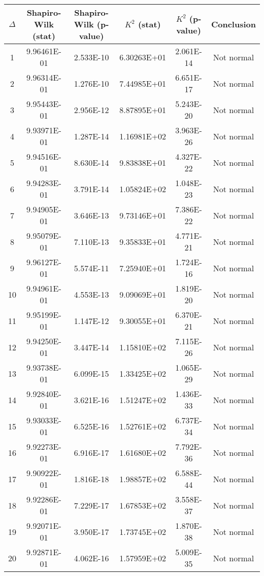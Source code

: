 \begin{table}[h]
	\begin{tabular}{|c|c|c|c|c|c|}
		\hline
		$\Delta$ &  Shapiro-Wilk (stat) & Shapiro-Wilk (p-value) & $K^2$ (stat) & $K^2$ (p-value) & Conclusion\\\hline
		\hline
		1 & 9.96461E-01 & 2.533E-10 & 6.30263E+01 & 2.061E-14 & Not normal\\\hline
		2 & 9.96314E-01 & 1.276E-10 & 7.44985E+01 & 6.651E-17 & Not normal\\\hline
		3 & 9.95443E-01 & 2.956E-12 & 8.87895E+01 & 5.243E-20 & Not normal\\\hline
		4 & 9.93971E-01 & 1.287E-14 & 1.16981E+02 & 3.963E-26 & Not normal\\\hline
		5 & 9.94516E-01 & 8.630E-14 & 9.83838E+01 & 4.327E-22 & Not normal\\\hline
		6 & 9.94283E-01 & 3.791E-14 & 1.05824E+02 & 1.048E-23 & Not normal\\\hline
		7 & 9.94905E-01 & 3.646E-13 & 9.73146E+01 & 7.386E-22 & Not normal\\\hline
		8 & 9.95079E-01 & 7.110E-13 & 9.35833E+01 & 4.771E-21 & Not normal\\\hline
		9 & 9.96127E-01 & 5.574E-11 & 7.25940E+01 & 1.724E-16 & Not normal\\\hline
		10 & 9.94961E-01 & 4.553E-13 & 9.09069E+01 & 1.819E-20 & Not normal\\\hline
		11 & 9.95199E-01 & 1.147E-12 & 9.30055E+01 & 6.370E-21 & Not normal\\\hline
		12 & 9.94250E-01 & 3.447E-14 & 1.15810E+02 & 7.115E-26 & Not normal\\\hline
		13 & 9.93738E-01 & 6.099E-15 & 1.33425E+02 & 1.065E-29 & Not normal\\\hline
		14 & 9.92840E-01 & 3.621E-16 & 1.51247E+02 & 1.436E-33 & Not normal\\\hline
		15 & 9.93033E-01 & 6.525E-16 & 1.52761E+02 & 6.737E-34 & Not normal\\\hline
		16 & 9.92273E-01 & 6.916E-17 & 1.61680E+02 & 7.792E-36 & Not normal\\\hline
		17 & 9.90922E-01 & 1.816E-18 & 1.98857E+02 & 6.588E-44 & Not normal\\\hline
		18 & 9.92286E-01 & 7.229E-17 & 1.67853E+02 & 3.558E-37 & Not normal\\\hline
		19 & 9.92071E-01 & 3.950E-17 & 1.73745E+02 & 1.870E-38 & Not normal\\\hline
		20 & 9.92871E-01 & 4.062E-16 & 1.57959E+02 & 5.009E-35 & Not normal\\\hline

\end{tabular}
\end{table}
